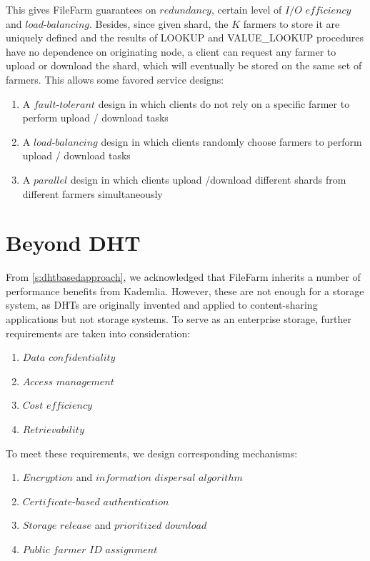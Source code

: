 This gives FileFarm guarantees on $redundancy$, certain level of $I/O$ $efficiency$ and $load$-$balancing$. Besides, since given shard, the $K$ farmers to store it are uniquely defined and the results of LOOKUP and VALUE\_LOOKUP procedures have no dependence on originating node, a client can request any farmer to upload or download the shard, which will eventually be stored on the same set of farmers. This allows some favored service designs:

\begin{enumerate}
  \item A $fault$-$tolerant$ design in which clients do not rely on a specific farmer to perform upload / download tasks
  \item A $load$-$balancing$ design in which clients randomly choose farmers to perform upload / download tasks
  \item A $parallel$ design in which clients upload /download different shards from different farmers simultaneously
\end{enumerate}

\newpage

\section{Beyond DHT}
\label{s:beyonddht}

From \ref{s:dhtbasedapproach}, we acknowledged that FileFarm inherits a number of performance benefits from Kademlia. However, these are not enough for a storage system, as DHTs are originally invented and applied to content-sharing applications but not storage systems. To serve as an enterprise storage, further requirements are taken into consideration:

\begin{enumerate}
  \item $Data$ $confidentiality$
  \item $Access$ $management$
  \item $Cost$ $efficiency$
  \item $Retrievability$
\end{enumerate}

\noindent To meet these requirements, we design corresponding mechanisms:

\begin{enumerate}
  \item $Encryption$ and $information$ $dispersal$ $algorithm$
  \item $Certificate$-$based$ $authentication$
  \item $Storage$ $release$ and $prioritized$ $download$
  \item $Public$ $farmer$ $ID$ $assignment$
\end{enumerate}

